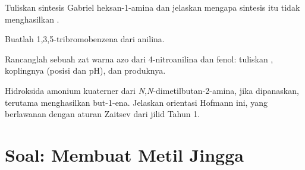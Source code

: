 \begin{exercise}[$\star\star$]\label{exo:b2:amines:9}
Tuliskan sintesis Gabriel heksan-1-amina dan jelaskan mengapa sintesis itu tidak menghasilkan .
\end{exercise}

\begin{exercise}[$\star\star\star$]\label{exo:b2:amines:10}
Buatlah 1,3,5-tribromobenzena dari anilina.
\end{exercise}

\begin{exercise}[$\star\star\star$]\label{exo:b2:amines:11}
Rancanglah sebuah zat warna azo dari 4-nitroanilina dan fenol: tuliskan
, koplingnya (posisi dan pH), dan produknya.
\end{exercise}

\begin{exercise}[$\star\star\star$]\label{exo:b2:amines:12}
Hidroksida amonium kuaterner dari \textit{N},\textit{N}-dimetilbutan-2-amina,
jika dipanaskan, terutama menghasilkan but-1-ena. Jelaskan orientasi Hofmann
ini, yang berlawanan dengan aturan Zaitsev dari jilid Tahun 1.
\end{exercise}

\section{Soal: Membuat Metil Jingga}

